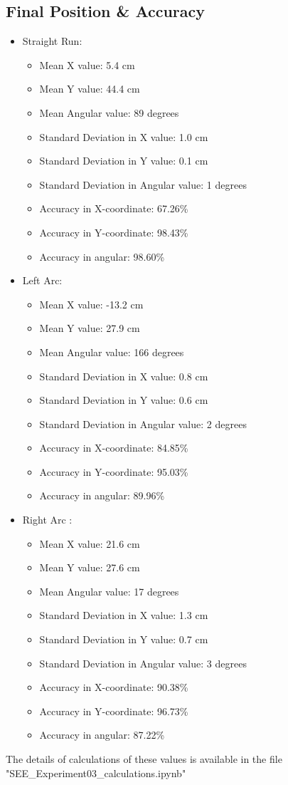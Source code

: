 \documentclass[10pt,a4paper]{article}
\begin{document}
				\subsection{Final Position \& Accuracy }
				\begin{itemize}
					\item Straight Run:		
						\begin{itemize}
							\item Mean X value: 5.4 cm
							\item Mean Y value: 44.4 cm
							\item Mean Angular value: 89 degrees
							\item Standard Deviation in X value: 1.0 cm
							\item Standard Deviation in Y value: 0.1 cm
							\item Standard Deviation in Angular value: 1 degrees
							\item Accuracy in X-coordinate: 67.26\%
							\item Accuracy in Y-coordinate: 98.43\%
							\item Accuracy in angular: 98.60\%
						\end{itemize}
					\item Left Arc:
						\begin{itemize}
							\item Mean X value: -13.2 cm
							\item Mean Y value: 27.9 cm
							\item Mean Angular value: 166 degrees
							\item Standard Deviation in X value: 0.8 cm
							\item Standard Deviation in Y value: 0.6 cm
							\item Standard Deviation in Angular value: 2 degrees
							\item Accuracy in X-coordinate:  84.85\%						
							\item Accuracy in Y-coordinate:   95.03\%
							\item Accuracy in angular:  89.96\%
						\end{itemize}
					\item Right Arc	:
						\begin{itemize}
							\item Mean X value: 21.6 cm
							\item Mean Y value: 27.6 cm
							\item Mean Angular value: 17 degrees
							\item Standard Deviation in X value: 1.3 cm
							\item Standard Deviation in Y value: 0.7 cm
							\item Standard Deviation in Angular value: 3 degrees
							\item Accuracy in X-coordinate:   90.38\%
							\item Accuracy in Y-coordinate:   96.73\%
							\item Accuracy in angular:  87.22\%
						\end{itemize}	
				\end{itemize}
				The details of calculations of these values is available in the file "SEE\_Experiment03\_calculations.ipynb"
\end{document}
